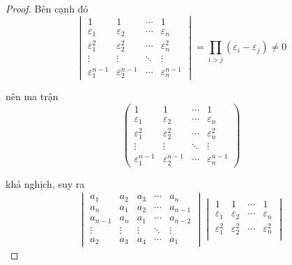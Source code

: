 \documentclass[class=linear-algebra,crop=false]{standalone}
\begin{document}
\begin{proof}
	\par Bên cạnh đó
	\[
		\begin{vmatrix}
			1                     & 1                     & \cdots & 1                     \\
			\varepsilon_{1}       & \varepsilon_{2}       & \cdots & \varepsilon_{n}       \\
			\varepsilon_{1}^{2}   & \varepsilon_{2}^{2}   & \cdots & \varepsilon_{n}^{2}   \\
			\vdots                & \vdots                & \ddots & \vdots                \\
			\varepsilon_{1}^{n-1} & \varepsilon_{2}^{n-1} & \cdots & \varepsilon_{n}^{n-1}
		\end{vmatrix}
		= \prod_{i>j}(\varepsilon_{i} - \varepsilon_{j}) \ne 0
	\]
	\par nên ma trận
	\[
		\begin{pmatrix}
			1                     & 1                     & \cdots & 1                     \\
			\varepsilon_{1}       & \varepsilon_{2}       & \cdots & \varepsilon_{n}       \\
			\varepsilon_{1}^{2}   & \varepsilon_{2}^{2}   & \cdots & \varepsilon_{n}^{2}   \\
			\vdots                & \vdots                & \ddots & \vdots                \\
			\varepsilon_{1}^{n-1} & \varepsilon_{2}^{n-1} & \cdots & \varepsilon_{n}^{n-1}
		\end{pmatrix}
	\]
	\par khả nghịch, suy ra
	\begin{align*}
		\begin{vmatrix}
			a_{1}   & a_{2}  & a_{3}  & \cdots & a_{n}   \\
			a_{n}   & a_{1}  & a_{2}  & \cdots & a_{n-1} \\
			a_{n-1} & a_{n}  & a_{1}  & \cdots & a_{n-2} \\
			\vdots  & \vdots & \vdots & \ddots & \vdots  \\
			a_{2}   & a_{3}  & a_{4}  & \cdots & a_{1}
		\end{vmatrix}
		\begin{vmatrix}
			1                     & 1                     & \cdots & 1                     \\
			\varepsilon_{1}       & \varepsilon_{2}       & \cdots & \varepsilon_{n}       \\
			\varepsilon_{1}^{2}   & \varepsilon_{2}^{2}   & \cdots & \varepsilon_{n}^{2}   \\

\end{vmatrix}
\end{align*}
\end{proof}
\end{document}
